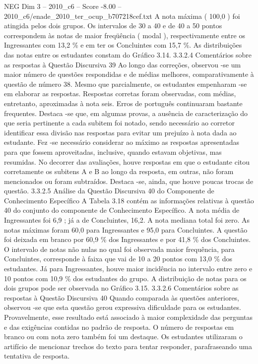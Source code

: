 \begin{textsample}{NEG Dim 3 – 2010\_c6 – Score -8.00 – 2010\_c6/enade\_2010\_ter\_ocup\_b707218cef.txt}
A nota máxima ( 100,0 ) foi atingida pelos dois grupos.
Os intervalos de 30 a 40 e de 40 a 50 pontos correspondem às notas de maior freqüência ( modal ), respectivamente entre os Ingressantes com 13,2 \% e em ter os Concluintes com 15,7 \%.
As distribuições das notas entre os estudantes constam do Gráfico 3.14. 3.3.2.4 Comentários sobre as respostas à Questão Discursiva 39 Ao longo das correções, observou -se um maior número de questões respondidas e de médias melhores, comparativamente à questão de número 38.
Mesmo que parcialmente, os estudantes empenharam -se em elaborar as respostas.
Respostas corretas foram observadas, com médias, entretanto, aproximadas à nota seis.
Erros de português continuaram bastante frequentes.
Destaca -se que, em algumas provas, a ausência de caracterização do que seria pertinente a cada subitem foi notado, sendo necessário ao corretor identificar essa divisão nas respostas para evitar um prejuízo à nota dada ao estudante.
Fez -se necessário considerar ao máximo as respostas apresentadas para que fossem aproveitadas, inclusive, quando estavam objetivas, mas resumidas.
No decorrer das avaliações, houve respostas em que o estudante citou corretamente os subitens A e B ao longo da resposta, em outras, não foram mencionados ou foram subtraídos.
Destaca -se, ainda, que houve poucas trocas de questão. 3.3.2.5 Análise da Questão Discursiva 40 do Componente de Conhecimento Específico A Tabela 3.18 contém as informações relativas à questão 40 do conjunto do componente de Conhecimento Específico.
A nota média de Ingressantes foi 6,9 ; já a de Concluintes, 16,2.
A nota mediana total foi zero.
As notas máximas foram 60,0 para Ingressantes e 95,0 para Concluintes.
A questão foi deixada em branco por 60,9 \% dos Ingressantes e por 41,8 \% dos Concluintes.
O intervalo de notas não nulas no qual foi observada maior frequência, para Concluintes, corresponde à faixa que vai de 10 a 20 pontos com 13,0 \% dos estudantes.
Já para Ingressantes, houve maior incidência no intervalo entre zero e 10 pontos com 10,9 \% dos estudantes do grupo.
A distribuição de notas para os dois grupos pode ser observada no Gráfico 3.15. 3.3.2.6 Comentários sobre as respostas à Questão Discursiva 40 Quando comparada às questões anteriores, observou -se que esta questão gerou expressiva dificuldade para os estudantes.
Provavelmente, esse resultado está associado à maior complexidade das perguntas e das exigências contidas no padrão de resposta.
O número de respostas em branco ou com nota zero também foi um destaque.
Os estudantes utilizaram o artifício de mencionar trechos do texto para tentar responder, parafraseando uma tentativa de resposta.

\end{textsample}
